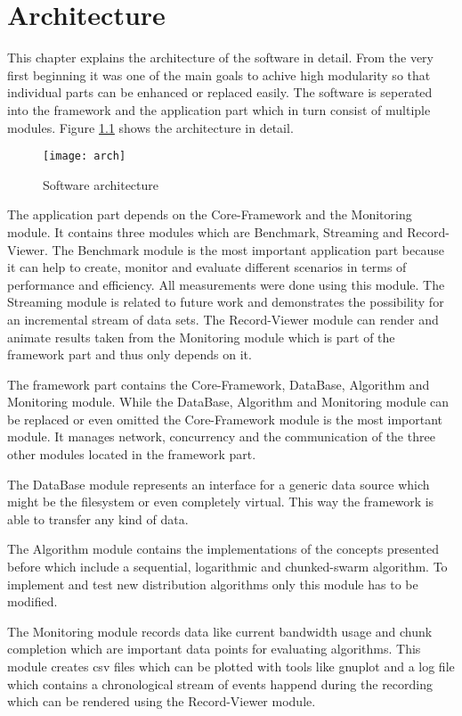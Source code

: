 \chapter{Architecture}

This chapter explains the architecture of the software in detail. From the very first beginning it was one of the main goals to achive high modularity so that individual parts can be enhanced or replaced easily. The software is seperated into the framework and the application part which in turn consist of multiple modules. Figure \ref{fig:arch} shows the architecture in detail.

\vspace{1cm}

\begin{figure}[h]
\centering
\texttt{[image: arch]}
\caption{Software architecture}
\label{fig:arch}
\end{figure}

\clearpage

The application part depends on the Core-Framework and the Monitoring module. It contains three modules which are Benchmark, Streaming and Record-Viewer. The Benchmark module is the most important application part because it can help to create, monitor and evaluate different scenarios in terms of performance and efficiency. All measurements were done using this module. The Streaming module is related to future work and demonstrates the possibility for an incremental stream of data sets. The Record-Viewer module can render and animate results taken from the Monitoring module which is part of the framework part and thus only depends on it.

The framework part contains the Core-Framework, DataBase, Algorithm and Monitoring module. While the DataBase, Algorithm and Monitoring module can be replaced or even omitted the Core-Framework module is the most important module. It manages network, concurrency and the communication of the three other modules located in the framework part. 

The DataBase module represents an interface for a generic data source which might be the filesystem or even completely virtual. This way the framework is able to transfer any kind of data.

The Algorithm module contains the implementations of the concepts presented before which include a sequential, logarithmic and chunked-swarm algorithm. To implement and test new distribution algorithms only this module has to be modified.

The Monitoring module records data like current bandwidth usage and chunk completion which are important data points for evaluating algorithms. This module creates csv files which can be plotted with tools like gnuplot and a log file which contains a chronological stream of events happend during the recording which can be rendered using the Record-Viewer module.
